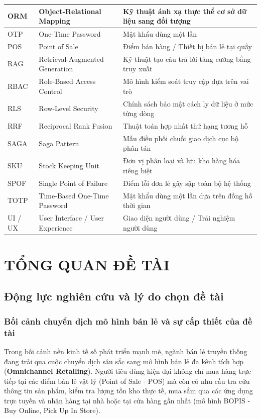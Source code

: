 \documentclass[12pt,a4paper]{report}
\begin{document}
\begin{longtable}{|p{2.5cm}|p{6cm}|p{6.5cm}|}
ORM & Object-Relational Mapping & Kỹ thuật ánh xạ thực thể cơ sở dữ liệu sang đối tượng \\ \hline
OTP & One-Time Password & Mật khẩu dùng một lần \\ \hline
POS & Point of Sale & Điểm bán hàng / Thiết bị bán lẻ tại quầy \\ \hline
RAG & Retrieval-Augmented Generation & Kỹ thuật tạo câu trả lời tăng cường bằng truy xuất \\ \hline
RBAC & Role-Based Access Control & Mô hình kiểm soát truy cập dựa trên vai trò \\ \hline
RLS & Row-Level Security & Chính sách bảo mật cách ly dữ liệu ở mức từng dòng \\ \hline
RRF & Reciprocal Rank Fusion & Thuật toán hợp nhất thứ hạng tương hỗ \\ \hline
SAGA & Saga Pattern & Mẫu điều phối chuỗi giao dịch cục bộ phân tán \\ \hline
SKU & Stock Keeping Unit & Đơn vị phân loại và lưu kho hàng hóa riêng biệt \\ \hline
SPOF & Single Point of Failure & Điểm lỗi đơn lẻ gây sập toàn bộ hệ thống \\ \hline
TOTP & Time-Based One-Time Password & Mật khẩu dùng một lần dựa trên đồng hồ thời gian \\ \hline
UI / UX & User Interface / User Experience & Giao diện người dùng / Trải nghiệm người dùng \\ \hline
\end{longtable}

\newpage

\chapter{TỔNG QUAN ĐỀ TÀI}

\section{Động lực nghiên cứu và lý do chọn đề tài}

\subsection{Bối cảnh chuyển dịch mô hình bán lẻ và sự cấp thiết của đề tài}
Trong bối cảnh nền kinh tế số phát triển mạnh mẽ, ngành bán lẻ truyền thống đang trải qua cuộc chuyển dịch sâu sắc sang mô hình bán lẻ đa kênh tích hợp (\textbf{Omnichannel Retailing}). Người tiêu dùng hiện đại không chỉ mua hàng trực tiếp tại các điểm bán lẻ vật lý (Point of Sale - POS) mà còn có nhu cầu tra cứu thông tin sản phẩm, kiểm tra lượng tồn kho thực tế, mua sắm qua các ứng dụng trực tuyến và nhận hàng tại nhà hoặc tại cửa hàng gần nhất (mô hình BOPIS - Buy Online, Pick Up In Store).
\end{document}

